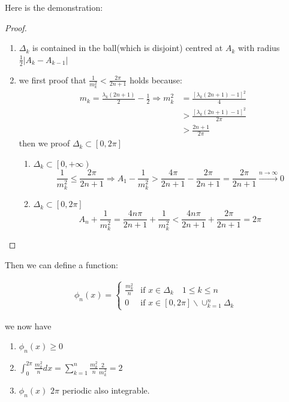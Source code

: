 \documentclass{article}
\begin{document}
Here is the demonstration:\par 
\begin{proof}
    \begin{enumerate}
        \item $ \Delta_k  $ is contained in the ball(which is disjoint) centred at $ A_k $ with radius $ \frac{1}{2}|A_k-A_{k-1}| $
        \item  we first proof that $ \frac{1}{m_k^2}<\frac{2\pi}{2n+1} $ holds because:
        \begin{align*}
            m_k = \frac{\lambda_k(2n+1)}{2} - \frac{1}{2} \Rightarrow m_k^2 &= \frac{[\lambda_k(2n+1)-1]^2}{4} \\
            &> \frac{[\lambda_k(2n+1)-1]^2}{2\pi} \\
            &> \frac{2n+1}{2\pi}
        \end{align*}
        then we proof $ \Delta_k \subset [0,2\pi] $ 

        \begin{enumerate}
            \item $ \Delta_k \subset \left[0,+\infty\right) $
                   \[\frac{1}{m_k^2}\leqslant \frac{2\pi}{2n+1} \Rightarrow A_1-\frac{1}{m_k^2}>\frac{4\pi}{2n+1}-\frac{2\pi}{2n+1}=\frac{2\pi}{2n+1}\overset{n \to \infty}{\longrightarrow}0\]
            \item $\Delta_k \subset [0,2\pi ]$
                    \[ A_n +\frac{1}{m_k^2}=\frac{4 n \pi}{2n+1}+\frac{1}{m_k^2}<\frac{4n \pi}{2n+1}+\frac{2\pi}{2n+1}=2\pi \]
                   
        \end{enumerate}
        \end{enumerate}     
\end{proof}

Then we can define a function:

\begin{align}
\phi_n(x) =
\begin{cases}
    \frac{m_k^2}{n}& \text{if } x\in \Delta_k \quad 1 \leqslant k \leqslant n \\
    0 & \text{if } x \in [0,2\pi]\backslash \cup_{k=1}^n \Delta_k
\end{cases}
\end{align}

we now have 

\begin{enumerate}
    \item $ \phi_n(x)\geqslant 0 $
    \item $ \int_{0}^{2\pi}\frac{m_k^2}{n}dx = \sum_{k=1}^{n}\frac{m_k^2}{n}\frac{2}{m_k^2}=2 $
    \item $\phi_n(x) $ $ 2\pi $ periodic also integrable.
\end{enumerate}
\end{document}
